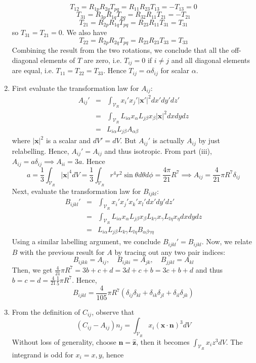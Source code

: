 \documentclass[a4paper]{article}
\begin{document}
\begin{ans}
\begin{enumerate}[label=(\roman*)]
    $$T_{12}=R_{1p}R_{2q}T_{pq}=R_{11}R_{23}T_{13}=-T_{13}=0$$
    $$T_{31}=R_{3p}R_{1q}T_{pq}=R_{32}R_{11}T_{21}=-T_{21}$$
    $$T_{21}=R_{2p}R_{1q}T_{pq}=R_{23}R_{11}T_{31}=T_{31}$$
    so $T_{31}=T_{21}=0$. We also have
    $$T_{22}=R_{2p}R_{2q}T_{pq}=R_{23}R_{23}T_{33}=T_{33}$$
    Combining the result from the two rotations, we conclude that all the off-diagonal elements of $T$ are zero, i.e. $T_{ij}=0$ if $i\neq j$ and all diagonal elements are equal, i.e. $T_{11}=T_{22}=T_{33}$. Hence $T_{ij}=\alpha\delta_{ij}$ for scalar $\alpha$.
\item First evaluate the transformation law for $A_{ij}$:
\begin{eqnarray}
A_{ij}'&=&\int_{\mathcal{V}_R}x_i'x_j'|\mathbf{x'}|^2dx'dy'dz'\nonumber\\&=&\int_{\mathcal{V}_R}L_{i\alpha}x_\alpha L_{j\beta}x_\beta|\mathbf{x}|^2dxdydz\nonumber\\&=&L_{i\alpha}L_{j\beta}A_{\alpha\beta}\nonumber
\end{eqnarray}
where $|\mathbf{x}|^2$ is a scalar and $dV'=dV$. But $A_{ij}'$ is actually $A_{ij}$ by just relabelling. Hence, $A_{ij}'=A_{ij}$ and thus isotropic. From part (iii), $A_{ij}=a\delta_{ij}\implies A_{ii}=3a$. Hence
$$a=\frac{1}{3}\int_{\mathcal{V}_R}|\mathbf{x}|^4dV=\frac{1}{3}\int_{\mathcal{V}_R}r^4r^2\sin\theta d\theta d\phi=\frac{4\pi}{21}R^7\implies A_{ij}=\frac{4}{21}\pi R^7\delta_{ij}$$
Next, evaluate the transformation law for $B_{ijkl}$:
\begin{eqnarray}
B_{ijkl}'&=&\int_{\mathcal{V}_R}x_i'x_j'x_k'x_l'dx'dy'dz'\nonumber\\&=&\int_{\mathcal{V}_R}L_{i\alpha}x_\alpha L_{j\beta}x_\beta L_{k\gamma}x_\gamma L_{l\eta}x_\eta dxdydz\nonumber\\&=&L_{i\alpha}L_{j\beta}L_{k\gamma}L_{l\eta}B_{\alpha\beta\gamma\eta}\nonumber
\end{eqnarray}
Using a similar labelling argument, we conclude $B_{ijkl}'=B_{ijkl}$. Now, we relate $B$ with the previous result for $A$ by tracing out any two pair indices: $$B_{ijkk}=A_{ij},\quad B_{ijki}=A_{jk},\quad B_{jjkl}=A_{kl}$$
Then, we get $\frac{4}{21}\pi R^7=3b+c+d=3d+c+b=3c+b+d$ and thus $b=c=d=\frac{4}{21}\frac{1}{5}\pi R^7$. Hence,
$$B_{ijkl}=\frac{4}{105}\pi R^7(\delta_{ij}\delta_{kl}+\delta_{ik}\delta_{jl}+\delta_{il}\delta_{jk})$$
\item From the definition of $C_{ij}$, observe that
$$(C_{ij}-A_{ij})n_j=\int_{\mathcal{V}_R}x_i(\mathbf{x}\cdot\mathbf{n})^3dV$$
Without loss of generality, choose $\mathbf{n}=\mathbf{\hat{z}}$, then it becomes $\int_{\mathcal{V}_R}x_iz^3dV$. The integrand is odd for $x_i=x,y$, hence

\end{enumerate}
\end{ans}
\end{document}
